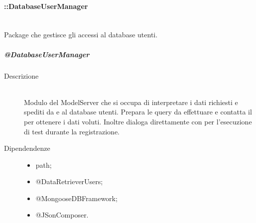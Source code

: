 \paragraph{::DatabaseUserManager} \hfill \\
Package che gestisce gli accessi al database utenti.

\subparagraph{@DatabaseUserManager}
\begin{description}
 \item[Descrizione] \hfill \\
Modulo del ModelServer che si occupa di interpretare i dati richiesti e spediti da e al database utenti. 
Prepara le query da effettuare e contatta il  per ottenere i dati voluti. 
Inoltre dialoga direttamente con  per l'esecuzione di test durante la registrazione. 
 \item[Dipendendenze] \hfill
 \begin{itemize}
  \item path;
  \item @DataRetrieverUsers;
  \item @MongooseDBFramework;
  \item @JSonComposer.
 \end{itemize}
  

\end{description}

